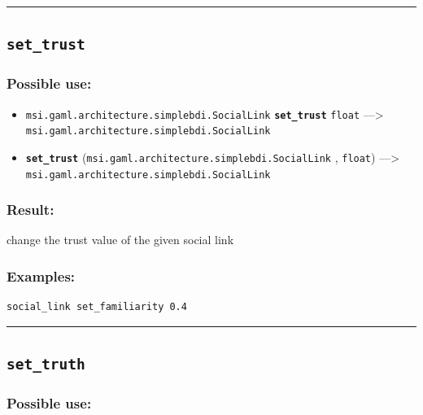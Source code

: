 \documentclass[]{book}
\providecommand{\tightlist}{%
  \setlength{\itemsep}{0pt}\setlength{\parskip}{0pt}}
\theoremstyle{definition}
\theoremstyle{definition}
\theoremstyle{definition}
\theoremstyle{remark}
\begin{document}
\begin{center}\rule{0.5\linewidth}{\linethickness}\end{center}

\subsection{\texorpdfstring{\texttt{set\_trust}}{set\_trust}}\label{set_trust}

\subsubsection{Possible use:}\label{possible-use-467}

\begin{itemize}
\tightlist
\item
  \texttt{msi.gaml.architecture.simplebdi.SocialLink}
  \textbf{\texttt{set\_trust}} \texttt{float} ---\textgreater{}
  \texttt{msi.gaml.architecture.simplebdi.SocialLink}
\item
  \textbf{\texttt{set\_trust}}
  (\texttt{msi.gaml.architecture.simplebdi.SocialLink} , \texttt{float})
  ---\textgreater{} \texttt{msi.gaml.architecture.simplebdi.SocialLink}
\end{itemize}

\subsubsection{Result:}\label{result-451}

change the trust value of the given social link

\subsubsection{Examples:}\label{examples-324}

\begin{verbatim}
social_link set_familiarity 0.4 
\end{verbatim}

\begin{center}\rule{0.5\linewidth}{\linethickness}\end{center}

\subsection{\texorpdfstring{\texttt{set\_truth}}{set\_truth}}\label{set_truth}

\subsubsection{Possible use:}\label{possible-use-468}
\end{document}
